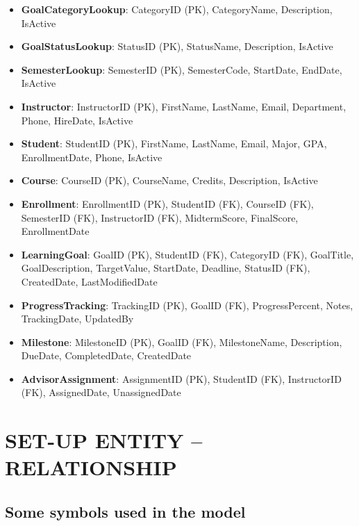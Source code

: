 \documentclass[12pt,a4paper]{report}
\begin{document}
\begin{itemize}
    \item \textbf{GoalCategoryLookup}: CategoryID (PK), CategoryName, Description, IsActive
    \item \textbf{GoalStatusLookup}: StatusID (PK), StatusName, Description, IsActive
    \item \textbf{SemesterLookup}: SemesterID (PK), SemesterCode, StartDate, EndDate, IsActive
    \item \textbf{Instructor}: InstructorID (PK), FirstName, LastName, Email, Department, Phone, HireDate, IsActive
    \item \textbf{Student}: StudentID (PK), FirstName, LastName, Email, Major, GPA, EnrollmentDate, Phone, IsActive
    \item \textbf{Course}: CourseID (PK), CourseName, Credits, Description, IsActive
    \item \textbf{Enrollment}: EnrollmentID (PK), StudentID (FK), CourseID (FK), SemesterID (FK), InstructorID (FK), MidtermScore, FinalScore, EnrollmentDate
    \item \textbf{LearningGoal}: GoalID (PK), StudentID (FK), CategoryID (FK), GoalTitle, GoalDescription, TargetValue, StartDate, Deadline, StatusID (FK), CreatedDate, LastModifiedDate
    \item \textbf{ProgressTracking}: TrackingID (PK), GoalID (FK), ProgressPercent, Notes, TrackingDate, UpdatedBy
    \item \textbf{Milestone}: MilestoneID (PK), GoalID (FK), MilestoneName, Description, DueDate, CompletedDate, CreatedDate
    \item \textbf{AdvisorAssignment}: AssignmentID (PK), StudentID (FK), InstructorID (FK), AssignedDate, UnassignedDate
\end{itemize}

\section{SET-UP ENTITY -- RELATIONSHIP}

\subsection*{Some symbols used in the model}
\end{document}
